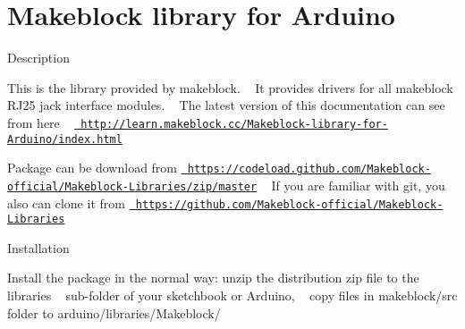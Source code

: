 \chapter{Makeblock library for Arduino}
\hypertarget{index}{}\label{index}
\begin{DoxyParagraph}{Description}

\end{DoxyParagraph}
This is the library provided by makeblock. ~\newline
It provides drivers for all makeblock RJ25 jack interface modules. ~\newline
 The latest version of this documentation can see from here ~\newline
\href{http://learn.makeblock.cc/Makeblock-library-for-Arduino/index.html}{\texttt{ http\+://learn.\+makeblock.\+cc/\+Makeblock-\/library-\/for-\/\+Arduino/index.\+html}}

Package can be download from \href{https://codeload.github.com/Makeblock-official/Makeblock-Libraries/zip/master}{\texttt{ https\+://codeload.\+github.\+com/\+Makeblock-\/official/\+Makeblock-\/\+Libraries/zip/master}} ~\newline
If you are familiar with git, you also can clone it from \href{https://github.com/Makeblock-official/Makeblock-Libraries}{\texttt{ https\+://github.\+com/\+Makeblock-\/official/\+Makeblock-\/\+Libraries}}

\begin{DoxyParagraph}{Installation}

\end{DoxyParagraph}
Install the package in the normal way\+: unzip the distribution zip file to the libraries ~\newline
sub-\/folder of your sketchbook or Arduino, ~\newline
copy files in makeblock/src folder to arduino/libraries/\+Makeblock/

